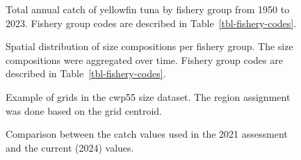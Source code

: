 \documentclass[
]{scrartcl}
\begin{document}
\begin{figure}


\caption{\label{fig-catch-bar}Total annual catch of yellowfin tuna by
fishery group from 1950 to 2023. Fishery group codes are described in
Table~\ref{tbl-fishery-codes}.}

\end{figure}%

\newpage{}

\begin{figure}


\caption{\label{fig-size-grid}Spatial distribution of size compositions
per fishery group. The size compositions were aggregated over time.
Fishery group codes are described in Table~\ref{tbl-fishery-codes}.}

\end{figure}%

\newpage{}

\begin{figure}


\caption{\label{fig-map-grid-agg2}Example of grids in the cwp55 size
dataset. The region assignment was done based on the grid centroid.}

\end{figure}%

\newpage{}

\begin{figure}


\caption{\label{fig-comp-catch}Comparison between the catch values used
in the 2021 assessment and the current (2024) values.}

\end{figure}%
\end{document}
